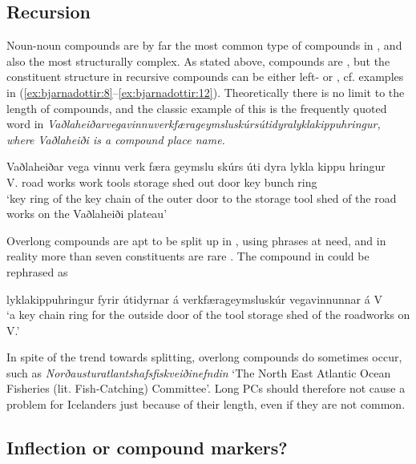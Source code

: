 \documentclass[output=paper]{LSP/langsci}
\begin{document}
\subsection{Recursion}\label{sec:bjarnadottir:2.2}

Noun-noun compounds are by far the most common type of compounds in , and also the most structurally complex. As stated above,  compounds are , but the constituent structure in recursive compounds can be either left- or , cf. examples in (\ref{ex:bjarnadottir:8}–\ref{ex:bjarnadottir:12}). Theoretically there is no limit to the length of compounds, and the classic example of this is the frequently quoted word in  \emph{Vaðlaheiðarvegavinnuverkfærageymsluskúrsútidyra\-ly\-klakippuhringur\textup{, where}} \emph{Vaðlaheiði \textup{is a compound place name.}} 

 \ea\label{ex:bjarnadottir:3} 
 \gll Vaðlaheiðar vega vinnu verk  færa geymslu skúrs úti dyra lykla kippu hringur\\
 V. road  works  work tools storage shed  out door key bunch ring\\
\glt ‘key ring of the key chain of the outer door to the storage tool shed of the road works on the Vaðlaheiði plateau’
\z 

{{Overlong compounds are apt to be split up in , using  phrases at need, and in reality more than seven constituents are rare \citep{Snædal1992,DaðasonEtAl2014}. The compound in  could be rephrased as} }

\ea
lyklakippuhringur fyrir útidyrnar á verkfærageymsluskúr vegavinnunnar á V\\
\glt ‘a key chain ring for the outside door of the tool storage shed of the roadworks on V.’
\z

In spite of the trend towards splitting, overlong compounds do sometimes occur, such as \emph{Norðausturatlantshafsfiskveiðinefndin} ‘The North East Atlantic Ocean Fisheries (lit. Fish-Catching) Committee’. Long PCs should therefore not cause a problem for Icelanders just because of their length, even if they are not common. 

\subsection{Inflection or compound markers?}\label{sec:bjarnadottir:2.3}
\end{document}
